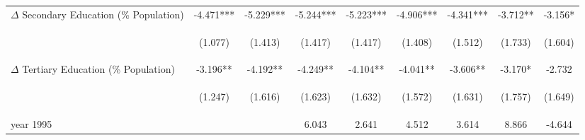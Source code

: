 \begin{landscape}
\begin{table}[htpb!]
\begin{center}
\begin{tabular}{lcccccccc}
$\Delta$ Secondary Education (\% Population) &-4.471***&-5.229***&-5.244***&-5.223***&-4.906***&-4.341***&-3.712**&-3.156*\\
&\begin{footnotesize}(1.077)\end{footnotesize}&\begin{footnotesize}(1.413)\end{footnotesize}&\begin{footnotesize}(1.417)\end{footnotesize}&\begin{footnotesize}(1.417)\end{footnotesize}&\begin{footnotesize}(1.408)\end{footnotesize}&\begin{footnotesize}(1.512)\end{footnotesize}&\begin{footnotesize}(1.733)\end{footnotesize}&\begin{footnotesize}(1.604)\end{footnotesize}\\
$\Delta$ Tertiary Education (\% Population) &-3.196**&-4.192**&-4.249**&-4.104**&-4.041**&-3.606**&-3.170*&-2.732\\
&\begin{footnotesize}(1.247)\end{footnotesize}&\begin{footnotesize}(1.616)\end{footnotesize}&\begin{footnotesize}(1.623)\end{footnotesize}&\begin{footnotesize}(1.632)\end{footnotesize}&\begin{footnotesize}(1.572)\end{footnotesize}&\begin{footnotesize}(1.631)\end{footnotesize}&\begin{footnotesize}(1.757)\end{footnotesize}&\begin{footnotesize}(1.649)\end{footnotesize}\\
year 1995&&&6.043&2.641&4.512&3.614&8.866&-4.644\\

\end{tabular}
\end{center}
\end{table}
\end{landscape}
